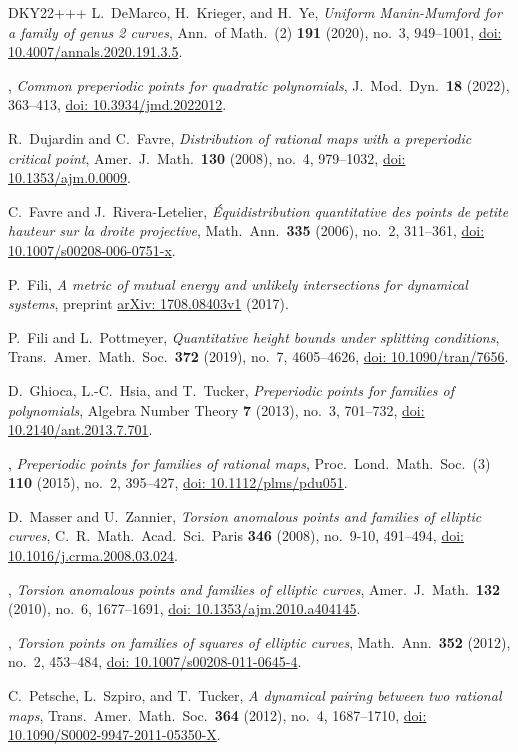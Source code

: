 \documentclass[10pt,a4paper]{amsart}
\numberwithin{equation}{section}
\theoremstyle{plain}
\theoremstyle{definition}
\theoremstyle{remark}
\providecommand{\doi}[1]{\href{https://doi.org/#1}{doi: #1}}
\providecommand{\arXiv}[1]{\href{https://arxiv.org/abs/#1}{arXiv: #1}}
\begin{document}
\begin{thebibliography}{DKY22+++}
L.~DeMarco, H.~Krieger, and H.~Ye,
\emph{Uniform Manin-Mumford for a family of genus 2 curves},
Ann.\ of Math.~(2) \textbf{191} (2020), no.~3, 949--1001,
\doi{10.4007/annals.2020.191.3.5}. 

\bysame, 
\emph{Common preperiodic points for quadratic polynomials},
J.~Mod.\ Dyn.\ \textbf{18} (2022), 363--413,
\doi{10.3934/jmd.2022012}.

R.~Dujardin and C.~Favre,
\emph{Distribution of rational maps with a preperiodic critical point},
Amer.~J.\ Math.\ \textbf{130} (2008), no.~4, 979--1032,
\doi{10.1353/ajm.0.0009}.

C.~Favre and J.~Rivera-Letelier,
\emph{\'Equidistribution quantitative des points de petite hauteur sur la droite projective}, 
Math.\ Ann.\ \textbf{335} (2006), no.~2, 311--361,
\doi{10.1007/s00208-006-0751-x}.

P.~Fili,
\emph{A metric of mutual energy and unlikely intersections for dynamical systems}, preprint \arXiv{1708.08403v1} (2017). 

P.~Fili and L.~Pottmeyer,
\emph{Quantitative height bounds under splitting conditions},
Trans.\ Amer.\ Math.\ Soc.\ \textbf{372} (2019), no.~7, 4605--4626,
\doi{10.1090/tran/7656}.

D.~Ghioca, L.-C.~Hsia, and T.~Tucker,
\emph{Preperiodic points for families of polynomials},
Algebra Number Theory \textbf{7} (2013), no.~3, 701--732,
\doi{10.2140/ant.2013.7.701}.

\bysame, 
\emph{Preperiodic points for families of rational maps},
Proc.\ Lond.\ Math.\ Soc.~(3) \textbf{110} (2015), no.~2, 395--427,
\doi{10.1112/plms/pdu051}.

D.~Masser and U.~Zannier,
\emph{Torsion anomalous points and families of elliptic curves},
C.\ R.\ Math.\ Acad.\ Sci.\ Paris \textbf{346} (2008), no.~9-10, 491--494,
\doi{10.1016/j.crma.2008.03.024}.

\bysame, 
\emph{Torsion anomalous points and families of elliptic curves},
Amer.~J.\ Math.\ \textbf{132} (2010), no.~6, 1677--1691,
\doi{10.1353/ajm.2010.a404145}.

\bysame,
\emph{Torsion points on families of squares of elliptic curves},
Math.\ Ann.\ \textbf{352} (2012), no.~2, 453--484,
\doi{10.1007/s00208-011-0645-4}.

C.~Petsche, L.~Szpiro, and T.~Tucker,
\emph{A dynamical pairing between two rational maps},
Trans.\ Amer.\ Math.\ Soc.\ \textbf{364} (2012), no.~4, 1687--1710,
\doi{10.1090/S0002-9947-2011-05350-X}.


\end{thebibliography}
\end{document}
